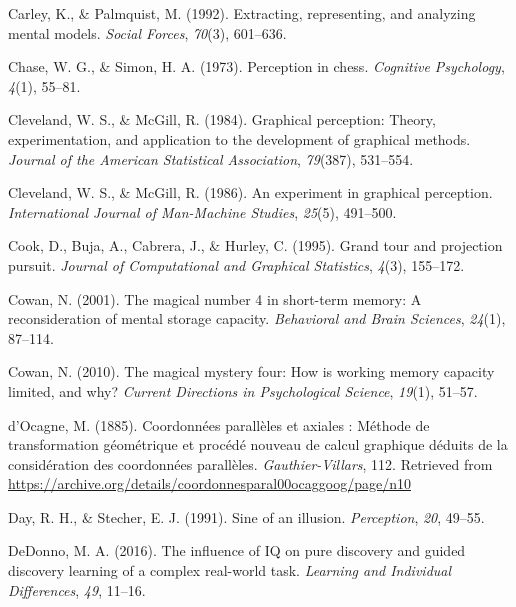 \documentclass[print]{nuthesis}
\newlength{\cslhangindent}
\newenvironment{CSLReferences}[2]%
{\setlength{\parindent}{0pt}%
\everypar{\setlength{\hangindent}{\cslhangindent}}\ignorespaces}%
{\par}
\begin{document}
\begin{CSLReferences}{1}{0}
\leavevmode{}%
Carley, K., \& Palmquist, M. (1992). Extracting, representing, and analyzing mental models. \emph{Social Forces}, \emph{70}(3), 601--636.

\leavevmode{}%
Chase, W. G., \& Simon, H. A. (1973). Perception in chess. \emph{Cognitive Psychology}, \emph{4}(1), 55--81.

\leavevmode{}%
Cleveland, W. S., \& McGill, R. (1984). Graphical perception: Theory, experimentation, and application to the development of graphical methods. \emph{Journal of the American Statistical Association}, \emph{79}(387), 531--554.

\leavevmode{}%
Cleveland, W. S., \& McGill, R. (1986). An experiment in graphical perception. \emph{International Journal of Man-Machine Studies}, \emph{25}(5), 491--500.

\leavevmode{}%
Cook, D., Buja, A., Cabrera, J., \& Hurley, C. (1995). Grand tour and projection pursuit. \emph{Journal of Computational and Graphical Statistics}, \emph{4}(3), 155--172.

\leavevmode{}%
Cowan, N. (2001). The magical number 4 in short-term memory: A reconsideration of mental storage capacity. \emph{Behavioral and Brain Sciences}, \emph{24}(1), 87--114.

\leavevmode{}%
Cowan, N. (2010). The magical mystery four: How is working memory capacity limited, and why? \emph{Current Directions in Psychological Science}, \emph{19}(1), 51--57.

\leavevmode{}%
d'Ocagne, M. (1885). {Coordonnées parallèles et axiales : Méthode de transformation géométrique et procédé nouveau de calcul graphique déduits de la considération des coordonnées parallèles}. \emph{Gauthier-Villars}, 112. Retrieved from \url{https://archive.org/details/coordonnesparal00ocaggoog/page/n10}

\leavevmode{}%
Day, R. H., \& Stecher, E. J. (1991). Sine of an illusion. \emph{Perception}, \emph{20}, 49--55.

\leavevmode{}%
DeDonno, M. A. (2016). The influence of IQ on pure discovery and guided discovery learning of a complex real-world task. \emph{Learning and Individual Differences}, \emph{49}, 11--16.


\end{CSLReferences}
\end{document}
